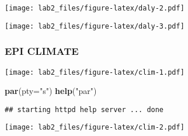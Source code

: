 \documentclass[
]{article}
\newenvironment{Shaded}{\begin{snugshade}}{\end{snugshade}}
\newcommand{\CommentTok}[1]{\textcolor[rgb]{0.56,0.35,0.01}{\textit{#1}}}
\newcommand{\DataTypeTok}[1]{\textcolor[rgb]{0.13,0.29,0.53}{#1}}
\newcommand{\KeywordTok}[1]{\textcolor[rgb]{0.13,0.29,0.53}{\textbf{#1}}}
\newcommand{\NormalTok}[1]{#1}
\newcommand{\OperatorTok}[1]{\textcolor[rgb]{0.81,0.36,0.00}{\textbf{#1}}}
\newcommand{\StringTok}[1]{\textcolor[rgb]{0.31,0.60,0.02}{#1}}
\begin{document}
\texttt{[image: lab2\_files/figure-latex/daly-2.pdf]}

\begin{Shaded}
\end{Shaded}

\texttt{[image: lab2\_files/figure-latex/daly-3.pdf]}

\hypertarget{epi-climate}{%
\subsubsection{EPI CLIMATE}\label{epi-climate}}

\begin{Shaded}
\end{Shaded}

\texttt{[image: lab2\_files/figure-latex/clim-1.pdf]}

\begin{Shaded}
\begin{Highlighting}[]
\KeywordTok{par}\NormalTok{(}\DataTypeTok{pty=}\StringTok{"s"}\NormalTok{)}
\KeywordTok{help}\NormalTok{(}\StringTok{"par"}\NormalTok{)}
\end{Highlighting}
\end{Shaded}

\begin{verbatim}
## starting httpd help server ... done
\end{verbatim}

\begin{Shaded}
\end{Shaded}

\texttt{[image: lab2\_files/figure-latex/clim-2.pdf]}
\end{document}
